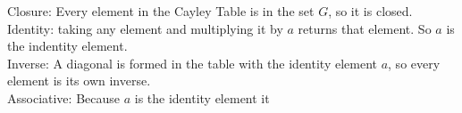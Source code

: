 \documentclass[12pt]{article}
\newlength{\strutheight}
\begin{document}
\begin{enumerate}
\begin{enumerate}
\begin{adjustbox}{valign=T,raise=\strutheight,minipage={1.0\linewidth}}
\begin{wrapfigure}{l}{0pt}
\begin{tabular}{c|cccc}
            \end{tabular}
            \end{wrapfigure}
            Closure: Every element in the Cayley Table is in the set $G$, so it is closed. \\
            Identity: taking any element and multiplying it by $a$ returns that element. So $a$ is the indentity element. \\
            Inverse: A diagonal is formed in the table with the identity element $a$, so every element is its own inverse. \\
            Associative: Because $a$ is the identity element it 
            \end{adjustbox}
    \end{enumerate}
\end{enumerate}
\end{document}
